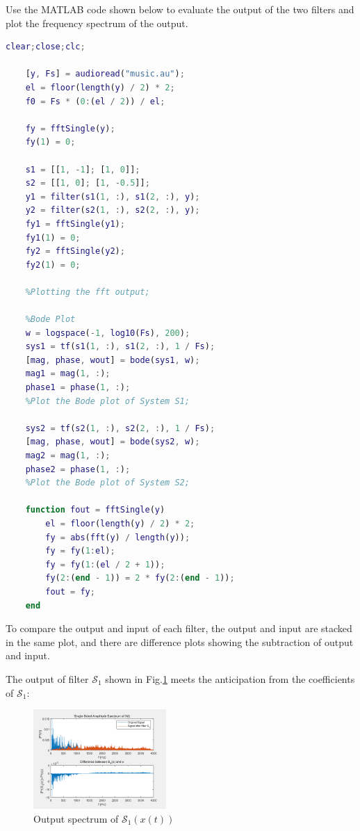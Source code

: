 \documentclass[conference]{IEEEtran}
\begin{document}
Use the MATLAB code shown below to evaluate the output of the two filters and plot the frequency spectrum of the output.
\begin{lstlisting}[language=matlab,style=matlab]
	clear;close;clc;

	[y, Fs] = audioread("music.au");
	el = floor(length(y) / 2) * 2;
	f0 = Fs * (0:(el / 2)) / el;

	fy = fftSingle(y);
	fy(1) = 0;

	s1 = [[1, -1]; [1, 0]];
	s2 = [[1, 0]; [1, -0.5]];
	y1 = filter(s1(1, :), s1(2, :), y);
	y2 = filter(s2(1, :), s2(2, :), y);
	fy1 = fftSingle(y1);
	fy1(1) = 0;
	fy2 = fftSingle(y2);
	fy2(1) = 0;

	%Plotting the fft output;

	%Bode Plot
	w = logspace(-1, log10(Fs), 200);
	sys1 = tf(s1(1, :), s1(2, :), 1 / Fs);
	[mag, phase, wout] = bode(sys1, w);
	mag1 = mag(1, :);
	phase1 = phase(1, :);
	%Plot the Bode plot of System S1;

	sys2 = tf(s2(1, :), s2(2, :), 1 / Fs);
	[mag, phase, wout] = bode(sys2, w);
	mag2 = mag(1, :);
	phase2 = phase(1, :);
	%Plot the Bode plot of System S2;

	function fout = fftSingle(y)
    	el = floor(length(y) / 2) * 2;
    	fy = abs(fft(y) / length(y));
    	fy = fy(1:el);
    	fy = fy(1:(el / 2 + 1));
    	fy(2:(end - 1)) = 2 * fy(2:(end - 1));
    	fout = fy;
	end
\end{lstlisting}

To compare the output and input of each filter, the output and input are stacked in the same plot, and there are difference plots showing the subtraction of output and input.

The output of filter \(\mathcal{S}_{1}\) shown in Fig.\ref{fig:out_s1} meets the anticipation from the coefficients of \(\mathcal{S}_{1}\):

\begin{figure}[htpb]
	\begin{small}
		\begin{center}
			\includegraphics[width=0.45\textwidth]{../matlab/q25_1.png}
		\end{center}
		\caption{Output spectrum of \(\mathcal{S}_{1}(x(t))\)}
		\label{fig:out_s1}
	\end{small}
\end{figure}
\end{document}
